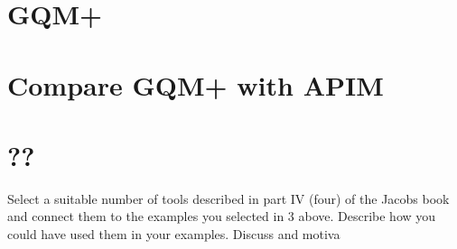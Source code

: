

\section{GQM+}

\section{Compare GQM+ with APIM}

\section{??}
Select a suitable number of tools described in part IV (four) of the Jacobs book and connect them to the examples you selected in 3 above. Describe how you could have used them in your examples. Discuss and motiva
